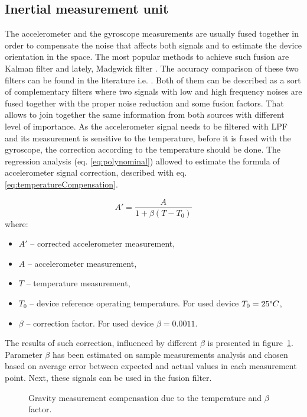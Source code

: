 \documentclass{llncs}
\begin{document}
\subsection{Inertial measurement unit}
The accelerometer and the gyroscope measurements are usually fused together in order to compensate the noise that affects both signals and to estimate the device orientation in the space. The most popular methods to achieve such fusion are Kalman filter \cite{Mccarron2013,Caron2006} and lately, Madgwick filter \cite{Kalkbrenner2014}. The accuracy comparison of these two filters can be found in the literature i.e. \cite{Madgwick2010}. Both of them can be described as a sort of complementary filters where two signals with low and high frequency noises are fused together with the proper noise reduction and some fusion factors. That allows to join together the same information from both sources with different level of importance. As the accelerometer signal needs to be filtered with LPF and its measurement is sensitive to the temperature, before it is fused with the gyroscope, the correction according to the temperature should be done. The regression analysis (eq. \eqref{eq:polynominal}) allowed to estimate the formula of accelerometer signal correction, described with eq. \eqref{eq:temperatureCompensation}. 

\begin{equation}
	\label{eq:temperatureCompensation}
	A' = \frac{A}{1+\beta(T - T_0)}
\end{equation}
where:
\begin{itemize}
	\item $A'$ -- corrected accelerometer measurement,
	\item $A$ -- accelerometer measurement,
	\item $T$ -- temperature measurement,
	\item $T_0$ -- device reference operating temperature. For used device $T_0 = 25\degree C$,
	\item $\beta$ -- correction factor. For used device $\beta = 0.0011$.
\end{itemize}

The results of such correction, influenced by different $\beta$ is presented in figure~\ref{fig:characteristics:imu:imuTempCompensation}. Parameter $\beta$ has been estimated on sample measurements analysis and chosen based on average error between expected and actual values in each measurement point. Next, these signals can be used in the fusion filter. 

\begin{figure}[h!]
	\centering 
	\vspace{2.5cm}
	\caption{Gravity measurement compensation due to the temperature and $\beta$ factor.}
	\label{fig:characteristics:imu:imuTempCompensation}
\end{figure}
\end{document}
